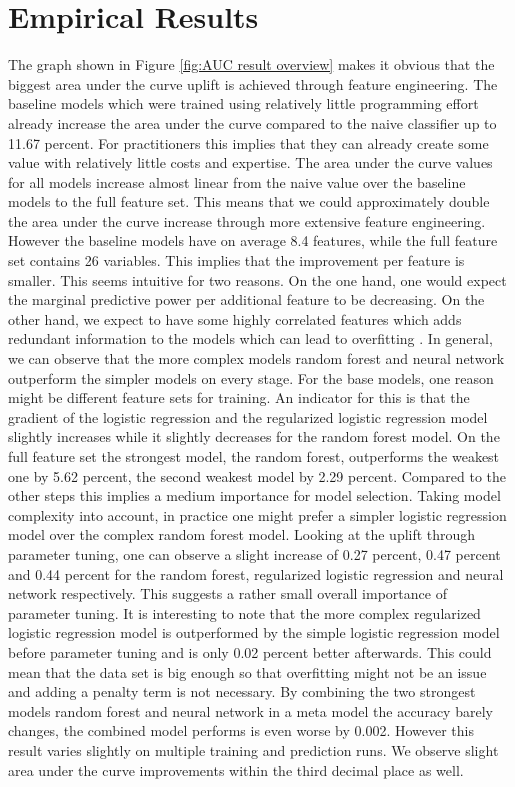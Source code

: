 \documentclass[12pt]{article}
\begin{document}
\section{Empirical Results}
The graph shown in Figure \ref{fig:AUC result overview} makes it obvious that the biggest area under the curve uplift is achieved through feature engineering. The baseline models which were trained using relatively little programming effort already increase the area under the curve compared to the naive classifier up to 11.67 percent. For practitioners this implies that they can already create some value with relatively little costs and expertise. The area under the curve values for all models increase almost linear from the naive value over the baseline models to the full feature set. This means that we could approximately double the area under the curve increase through more extensive feature engineering. However the baseline models have on average 8.4 features, while the full feature set contains 26 variables. This implies that the improvement per feature is smaller. This seems intuitive for two reasons. On the one hand, one would expect the marginal predictive power per additional feature to be decreasing. On the other hand, we expect to have some highly correlated features which adds redundant information to the models which can lead to overfitting \cite{WinNT4}. 
In general, we can observe that the more complex models random forest and neural network outperform the simpler models on every stage. For the base models, one reason might be different feature sets for training. An indicator for this is that the gradient of the logistic regression and the regularized logistic regression model slightly increases while it slightly decreases for the random forest model. On the full feature set the strongest model, the random forest, outperforms the weakest one by 5.62 percent, the second weakest model by 2.29 percent. Compared to the other steps this implies a medium importance for model selection. Taking model complexity into account, in practice one might prefer a simpler logistic regression model over the complex random forest model. Looking at the uplift through parameter tuning, one can observe a slight increase of 0.27 percent, 0.47 percent and 0.44 percent for the random forest, regularized logistic regression and neural network respectively. This suggests a rather small overall importance of parameter tuning. It is interesting to note that the more complex regularized logistic regression model is outperformed by the simple logistic regression model before parameter tuning and is only 0.02 percent better afterwards. This could mean that the data set is big enough so that overfitting might not be an issue and adding a penalty term is not necessary. By combining the two strongest models random forest and neural network in a meta model the accuracy barely changes, the combined model performs is even worse by 0.002. However this result varies slightly on multiple training and prediction runs. We observe slight area under the curve improvements within the third decimal place as well.
\end{document}

